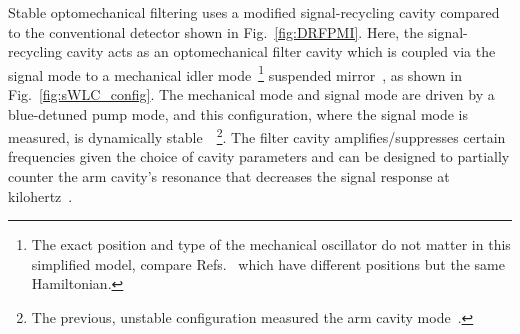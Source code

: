Stable optomechanical filtering uses a modified signal-recycling cavity compared to the conventional detector shown in Fig.~\ref{fig:DRFPMI}. Here, the signal-recycling cavity acts as an optomechanical filter cavity which is coupled via the signal mode to a mechanical idler mode~\footnote{The exact position and type of the mechanical oscillator do not matter in this simplified model, compare Refs.~\cite{liBroadbandSensitivityImprovement2020,liEnhancingInterferometerSensitivity2021} which have different positions but the same Hamiltonian.} suspended mirror~\cite{}, as shown in Fig.~\ref{fig:sWLC_config}. The mechanical mode and signal mode are driven by a blue-detuned pump mode, and this configuration, where the signal mode is measured, is dynamically stable~\cite{}~\footnote{The previous, unstable configuration measured the arm cavity mode~\cite{miaoEnhancingBandwidthGravitationalWave2015}.}.
The filter cavity amplifies/suppresses certain frequencies given the choice of cavity parameters and can be designed to partially counter the arm cavity's resonance that decreases the signal response at kilohertz~\cite{}. %

